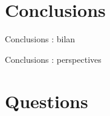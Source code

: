 \section{Conclusions}
\begin{frame}[c]{Conclusions : bilan}

\end{frame}

\begin{frame}[c]{Conclusions : perspectives}
	
\end{frame}

\section{Questions}